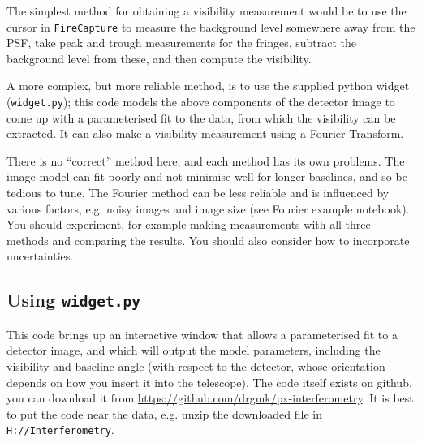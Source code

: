 \documentclass[11pt]{article}
\begin{document}
The simplest method for obtaining a visibility measurement would be to use the cursor in \texttt{FireCapture} to measure the background level somewhere away from the PSF, take peak and trough measurements for the fringes, subtract the background level from these, and then compute the visibility.

A more complex, but more reliable method, is to use the supplied python widget (\texttt{widget.py}); this code models the above components of the detector image to come up with a parameterised fit to the data, from which the visibility can be extracted. It can also make a visibility measurement using a Fourier Transform.

There is no ``correct'' method here, and each method has its own problems. The image model can fit poorly and not minimise well for longer baselines, and so be tedious to tune. The Fourier method can be less reliable and is influenced by various factors, e.g. noisy images and image size (see Fourier example notebook). You should experiment, for example making measurements with all three methods and comparing the results. You should also consider how to incorporate uncertainties.

\subsection{Using \texttt{widget.py}}\label{sec:widget}

This code brings up an interactive window that allows a parameterised fit to a detector image, and which will output the model parameters, including the visibility and baseline angle (with respect to the detector, whose orientation depends on how you insert it into the telescope). The code itself exists on github, you can download it from
\href{https://github.com/drgmk/px-interferometry}{https://github.com/drgmk/px-interferometry}. It is best to put the code near the data, e.g. unzip the downloaded file in \texttt{H://Interferometry}.
\end{document}
